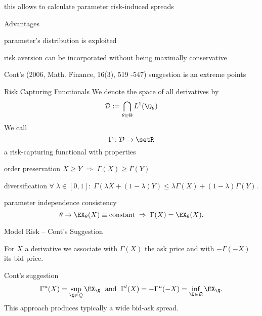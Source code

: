 	this allows to calculate parameter risk-induced spreads

	Advantages






	parameter's distribution is exploited

	risk aversion can be incorporated without being maximally conservative

	Cont's (2006, Math. Finance, 16(3), 519 -547) suggestion is an extreme points











{Risk Capturing Functionals}
We denote the space of all derivatives by
\begin{equation}
{\cal D} := \bigcap_{\theta \in \Theta} L^1(\Q_\theta)
\end{equation}
We call
$$
\Gamma: {\cal D} \rightarrow \setR
$$
a risk-capturing functional with properties






	order preservation $X \geq Y \; \Rightarrow \; \Gamma(X) \geq \Gamma(Y)$

	diversification $\forall \; \lambda \in [0,1]: \; \Gamma(\lambda X + (1-\lambda) Y) \leq \lambda \Gamma(X) + (1-\lambda) \Gamma(Y).$

	parameter independence consistency
$$
\theta \rightarrow \EX_\theta(X) \equiv \mbox{constant} \; \Rightarrow \; \Gamma(X) = \EX_\theta(X).
$$






{Model Risk -- Cont's Suggestion}






	For $X$ a derivative we associate with
$\Gamma(X)$ the ask price and with $-\Gamma(-X)$ its bid price.

	Cont's suggestion
$$
\Gamma^u(X)=\sup_{\Q \in {\cal Q}} \EX_{\Q} \; \mbox{ and } \;
\Gamma^l(X)= -\Gamma^u(-X)=\inf_{\Q \in {\cal Q}} \EX_{\Q}.
$$
This approach produces typically a wide bid-ask spread.



